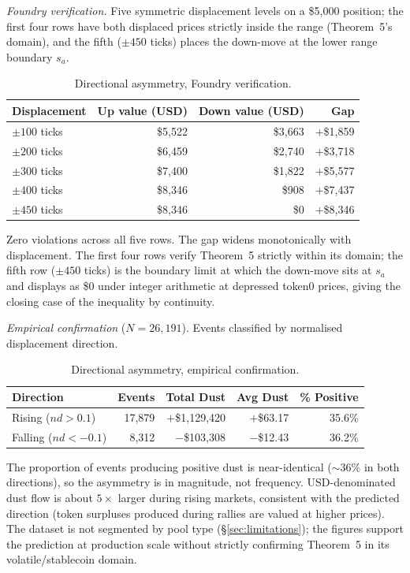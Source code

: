 \documentclass[11pt,a4paper]{article}
\theoremstyle{definition}
\begin{document}
\medskip
\noindent\textit{Foundry verification.} Five symmetric displacement levels on a \$5{,}000 position; the first four rows have both displaced prices strictly inside the range (Theorem~5's domain), and the fifth ($\pm 450$ ticks) places the down-move at the lower range boundary $s_a$.

\begin{table}[H]
\centering
\caption{Directional asymmetry, Foundry verification.}\label{tab:t5-foundry}
\begin{tabular}{@{}lrrr@{}}
\toprule
Displacement & Up value (USD) & Down value (USD) & Gap \\
\midrule
$\pm 100$ ticks & \$5,522 & \$3,663 & $+$\$1,859 \\
$\pm 200$ ticks & \$6,459 & \$2,740 & $+$\$3,718 \\
$\pm 300$ ticks & \$7,400 & \$1,822 & $+$\$5,577 \\
$\pm 400$ ticks & \$8,346 & \$908 & $+$\$7,437 \\
$\pm 450$ ticks & \$8,346 & \$0 & $+$\$8,346 \\
\bottomrule
\end{tabular}
\end{table}

\noindent Zero violations across all five rows. The gap widens monotonically with displacement. The first four rows verify Theorem~5 strictly within its domain; the fifth row ($\pm 450$ ticks) is the boundary limit at which the down-move sits at $s_a$ and displays as \$0 under integer arithmetic at depressed token0 prices, giving the closing case of the inequality by continuity.

\medskip
\noindent\textit{Empirical confirmation} ($N = 26{,}191$). Events classified by normalised displacement direction.

\begin{table}[H]
\centering
\caption{Directional asymmetry, empirical confirmation.}\label{tab:t5-empirical}
\begin{tabular}{@{}lrrrr@{}}
\toprule
Direction & Events & Total Dust & Avg Dust & \% Positive \\
\midrule
Rising ($nd > 0.1$) & 17,879 & $+$\$1,129,420 & $+$\$63.17 & 35.6\% \\
Falling ($nd < -0.1$) & 8,312 & $-$\$103,308 & $-$\$12.43 & 36.2\% \\
\bottomrule
\end{tabular}
\end{table}

\noindent The proportion of events producing positive dust is near-identical (${\sim}36\%$ in both directions), so the asymmetry is in magnitude, not frequency. USD-denominated dust flow is about $5\times$ larger during rising markets, consistent with the predicted direction (token surpluses produced during rallies are valued at higher prices). The dataset is not segmented by pool type (\S\ref{sec:limitations}); the figures support the prediction at production scale without strictly confirming Theorem~5 in its volatile/stablecoin domain.
\end{document}
